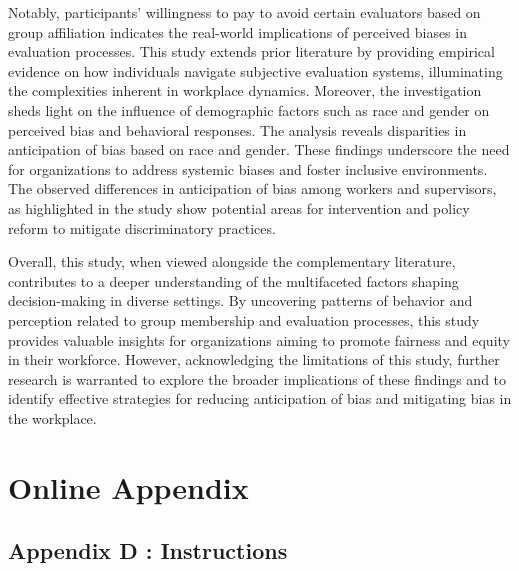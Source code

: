 Notably, participants' willingness to pay to avoid certain evaluators based on group affiliation indicates the real-world implications of perceived biases in evaluation processes. This study extends prior literature by providing empirical evidence on how individuals navigate subjective evaluation systems, illuminating the complexities inherent in workplace dynamics. Moreover, the investigation sheds light on the influence of demographic factors such as race and gender on perceived bias and behavioral responses. The analysis reveals disparities in anticipation of bias based on race and gender. These findings underscore the need for organizations to address systemic biases and foster inclusive environments. The observed differences in anticipation of bias among workers and supervisors, as highlighted in the study show potential areas for intervention and policy reform to mitigate discriminatory practices.

Overall, this study, when viewed alongside the complementary literature, contributes to a deeper understanding of the multifaceted factors shaping decision-making in diverse settings. By uncovering patterns of behavior and perception related to group membership and evaluation processes, this study provides valuable insights for organizations aiming to promote fairness and equity in their workforce. However, acknowledging the limitations of this study, further research is warranted to explore the broader implications of these findings and to identify effective strategies for reducing anticipation of bias and mitigating bias in the workplace.




\section{Online Appendix}




\subsection{Appendix D : Instructions}
